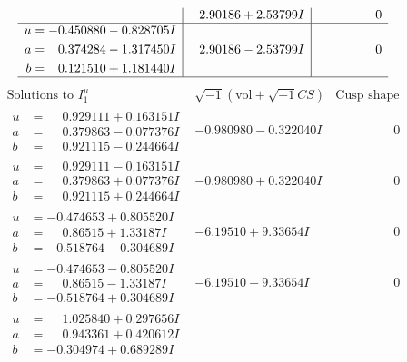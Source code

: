 \documentclass[1p]{elsarticle_modified}
\theoremstyle{definition}
\newcommand{\I}{\sqrt{-1}}
\begin{document}
$$\begin{array}{c|c|c}
 & \phantom{-}2.90186 + 2.53799 I & \phantom{-0.000000 } 0 \\ \hline\begin{aligned}
u &= -0.450880 - 0.828705 I \\
a &= \phantom{-}0.374284 - 1.317450 I \\
b &= \phantom{-}0.121510 + 1.181440 I\end{aligned}
 & \phantom{-}2.90186 - 2.53799 I & \phantom{-0.000000 } 0\\
 \hline 
 \end{array}$$\newpage$$\begin{array}{c|c|c}  
\text{Solutions to }I^u_{1}& \I (\text{vol} + \sqrt{-1}CS) & \text{Cusp shape}\\
 \hline 
\begin{aligned}
u &= \phantom{-}0.929111 + 0.163151 I \\
a &= \phantom{-}0.379863 - 0.077376 I \\
b &= \phantom{-}0.921115 - 0.244664 I\end{aligned}
 & -0.980980 - 0.322040 I & \phantom{-0.000000 } 0 \\ \hline\begin{aligned}
u &= \phantom{-}0.929111 - 0.163151 I \\
a &= \phantom{-}0.379863 + 0.077376 I \\
b &= \phantom{-}0.921115 + 0.244664 I\end{aligned}
 & -0.980980 + 0.322040 I & \phantom{-0.000000 } 0 \\ \hline\begin{aligned}
u &= -0.474653 + 0.805520 I \\
a &= \phantom{-}0.86515 + 1.33187 I \\
b &= -0.518764 - 0.304689 I\end{aligned}
 & -6.19510 + 9.33654 I & \phantom{-0.000000 } 0 \\ \hline\begin{aligned}
u &= -0.474653 - 0.805520 I \\
a &= \phantom{-}0.86515 - 1.33187 I \\
b &= -0.518764 + 0.304689 I\end{aligned}
 & -6.19510 - 9.33654 I & \phantom{-0.000000 } 0 \\ \hline\begin{aligned}
u &= \phantom{-}1.025840 + 0.297656 I \\
a &= \phantom{-}0.943361 + 0.420612 I \\
b &= -0.304974 + 0.689289 I\end{aligned}

\end{array}$$
\end{document}
